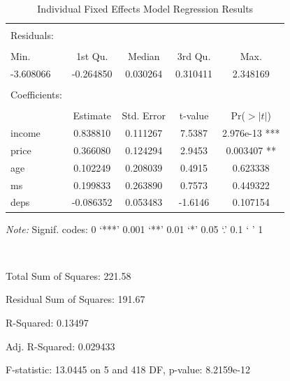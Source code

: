 \documentclass[12pt]{article}
\begin{document}
\begin{table}[!htbp] \centering 
\begin{threeparttable}
  \caption{Individual Fixed Effects Model Regression Results} 
  \label{} 
\begin{tabular}{@{\extracolsep{5pt}}lcccc} 
 \toprule
\midrule
\\
Residuals: \\
\hline \\[-1.8ex]
     Min.  & 1st Qu. &   Median &  3rd Qu.   &   Max. \\
-3.608066 & -0.264850 &  0.030264  & 0.310411 &  2.348169 \\
\\
Coefficients: \\
\hline \\[-1.8ex] 
   &     Estimate & Std. Error &  t-value  & Pr($>|t|$)    \\
income &  0.838810  &  0.111267 & 7.5387 & 2.976e-13 *** \\
price  &  0.366080  &  0.124294 & 2.9453 &  0.003407 ** \\
age   &  0.102249  &  0.208039  & 0.4915 &  0.623338    \\
ms    &  0.199833 &  0.263890 & 0.7573  & 0.449322    \\
deps   & -0.086352  & 0.053483 & -1.6146 &  0.107154  \\
\bottomrule
 \end{tabular}
 \begin{tablenotes}  
\small
\item \textit{Note:} Signif. codes:  0 ‘***’ 0.001 ‘**’ 0.01 ‘*’ 0.05 ‘.’ 0.1 ‘ ’ 1
\item \ 
\item Total Sum of Squares:    221.58
\item Residual Sum of Squares: 191.67
\item R-Squared:      0.13497
\item Adj. R-Squared: 0.029433
\item F-statistic: 13.0445 on 5 and 418 DF, p-value: 8.2159e-12
\end{tablenotes}
  \end{threeparttable}
\end{table} 
\end{document}
